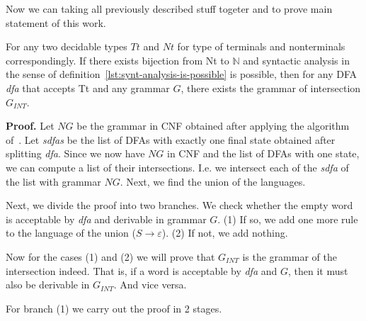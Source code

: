 Now we can taking all previously described stuff togeter and to prove main statement of this work.


\begin{theorem}
    For any two decidable types $Tt$ and $Nt$ for type of terminals and nonterminals correspondingly. If there exists bijection from Nt to $\mathbb{N}$ and syntactic analysis in the sense of definition~\ref{lst:synt-analysis-is-possible} is possible, then for any DFA \textit{dfa} that accepts Tt and any grammar $G$, there exists the grammar of intersection $G_{INT}$.
\end{theorem}   

\textbf{Proof.} 
Let $NG$ be the grammar in CNF obtained after applying the algorithm of~\cite{smolkaHofmann2016}. Let \textit{sdfas} be the list of DFAs with exactly one final state obtained after splitting \textit{dfa}.
Since we now have $NG$ in CNF and the list of DFAs with one state, we can compute a list of their intersections.
I.e. we intersect each of the \textit{sdfa} of the list with grammar $NG$.
Next, we find the union of the languages. 

Next, we divide the proof into two branches.
We check whether the empty word is acceptable by \textit{dfa} and derivable in grammar $G$.
(1) If so, we add one more rule to the language of the union ($ S \to \varepsilon$). (2) If not, we add nothing.

Now for the cases (1) and (2) we will prove that $G_{INT}$ is the grammar of the intersection indeed.
That is, if a word is acceptable by \textit{dfa} and $G$, then it must also be derivable in $G_{INT}$. And vice versa.

For branch (1) we carry out the proof in 2 stages.

